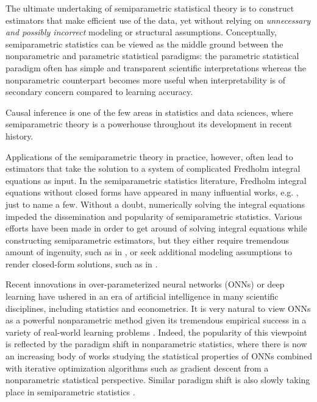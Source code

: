 \documentclass[11pt]{article}
\begin{document}
The ultimate undertaking of semiparametric statistical theory \citep{bickel1998efficient, van1998asymptotic, van2002part} is to construct estimators that make efficient use of the data, yet without relying on {\it unnecessary and possibly incorrect} modeling or structural assumptions. Conceptually, semiparametric statistics can be viewed as the middle ground between the nonparametric and parametric statistical paradigms: the parametric statistical paradigm often has simple and transparent scientific interpretations whereas the nonparametric counterpart becomes more useful when interpretability is of secondary concern compared to learning accuracy.

Causal inference is one of the few areas in statistics and data sciences, where semiparametric theory is a powerhouse throughout its development in recent history.

Applications of the semiparametric theory in practice, however, often lead to estimators that take the solution to a system of complicated Fredholm integral equations \citep{kress2013linear} as input. In the semiparametric statistics literature, Fredholm integral equations without closed forms have appeared in many influential works, e.g. \citet{robins1994estimation, robins1995semiparametric, scharfstein1999adjusting, robins2004estimation, zhang2019semiparametric, tchetgen2020introduction, zhao2021versatile}, just to name a few. Without a doubt, numerically solving the integral equations impeded the dissemination and popularity of semiparametric statistics. Various efforts have been made in order to get around of solving integral equations while constructing semiparametric estimators, but they either require tremendous amount of ingenuity, such as in \cite{matsouaka2017instrumental}, or seek additional modeling assumptions to render closed-form solutions, such as in \cite{liu2021efficient, yang2021semiparametric}.

Recent innovations in over-parameterized neural networks (ONNs) or deep learning have ushered in an era of artificial intelligence in many scientific disciplines, including statistics and econometrics. It is very natural to view ONNs as a powerful nonparametric method given its tremendous empirical success in a variety of real-world learning problems \citep{krizhevsky2012imagenet, bruna2014spectral, schmidhuber2015deep, silver2017mastering, carleo2017solving, baldi2018deep, jumper2021highly, tunyasuvunakool2021highly}. Indeed, the popularity of this viewpoint is reflected by the paradigm shift in nonparametric statistics, where there is now an increasing body of works studying the statistical properties of ONNs combined with iterative optimization algorithms such as gradient descent \citep{schmidt2020nonparametric, barron2018approximation, suzuki2019adaptivity, e2020machine, suzuki2020benefit, liang2020just, dou2021training, tsuji2021estimation} from a nonparametric statistical perspective. Similar paradigm shift is also slowly taking place in semiparametric statistics \citep{chen2020efficient, liu2020nearly, liu2020rejoinder, chernozhukov2020adversarial, farrell2021deep}.
\end{document}
